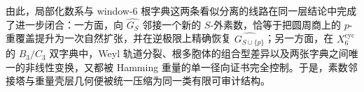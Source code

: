\noindent
由此，局部化数系与 window-\(6\) 根字典这两条看似分离的线路在同一层结论中完成了进一步闭合：一方面，向 \(\widehat{G_S}\) 邻接一个新的 \(S\)-外素数，恰等于把圆周商上的 \(p\)-重覆盖提升为一次自然扩张，并在逆极限上精确恢复 \(\widehat{G_{S\cup\{p\}}}\)；另一方面，在 \(X_6^{\mathrm{cyc}}\) 的 \(B_3/C_3\) 双字典中，Weyl 轨道分裂、根多胞体的组合型差异以及两张字典之间唯一的非线性变换，又都被 Hamming 重量的单一径向证书完全控制。于是，素数邻接塔与重量壳层几何便被统一压缩为同一类有限可审计结构。

\endinput
